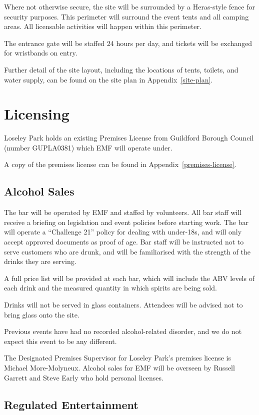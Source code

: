 Where not otherwise secure, the site will be surrounded by a Heras-style fence for security purposes.
This perimeter will surround the event tents and all camping areas. All licensable activities will happen
within this perimeter.

The entrance gate will be staffed 24 hours per day, and tickets will be exchanged for wristbands on entry.

Further detail of the site layout, including the locations of tents, toilets, and water supply,
can be found on the site plan in Appendix~\ref{site-plan}.

\section{Licensing}

Loseley Park holds an existing Premises License from Guildford Borough Council
(number GUPLA0381) which EMF will operate under.

A copy of the premises license can be found in Appendix~\ref{premises-license}.

\subsection{Alcohol Sales}

The bar will be operated by EMF and staffed by volunteers. All bar staff will receive a
briefing on legislation and event policies before starting work. The bar will operate a
``Challenge 21'' policy for dealing with under-18s, and will only accept
approved documents as proof of age. Bar staff will be instructed not to serve customers who are
drunk, and will be familiarised with the strength of the drinks they are serving.

A full price list will be provided at each bar, which will include the ABV levels of each drink
and the measured quantity in which spirits are being sold.

Drinks will not be served in glass containers. Attendees will be advised not to bring
glass onto the site.

Previous events have had no recorded alcohol-related disorder, and we do not expect this event
to be any different.

The Designated Premises Supervisor for Loseley Park's premises license is Michael More-Molyneux.
Alcohol sales for EMF will be overseen by Russell Garrett and Steve Early who hold personal licenses.

\subsection{Regulated Entertainment}

